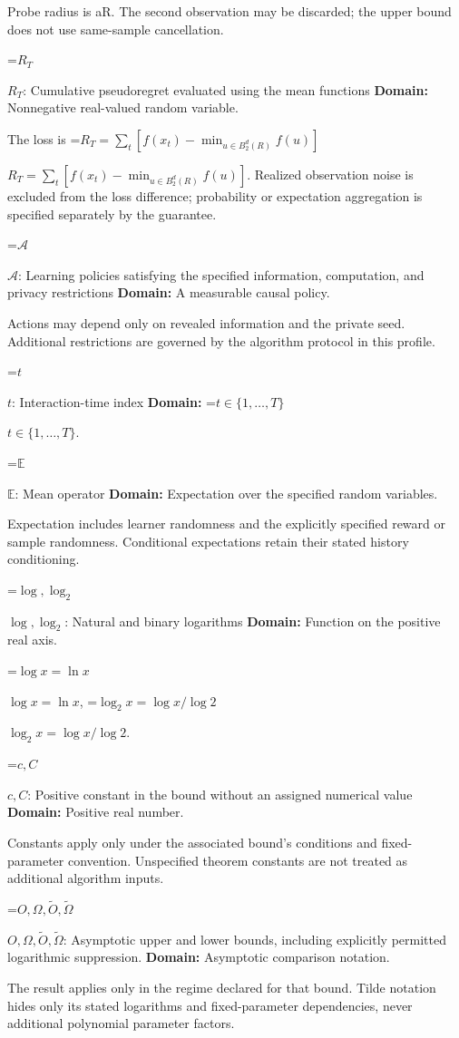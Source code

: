 \documentclass[10pt,a4paper]{article}
\newcommand{\AtlasMath}[1]{\par\begingroup\centering\setbox0=\hbox{$\displaystyle #1$}\ifdim\wd0>1.4\linewidth\typeout{ATLAS WIDE FORMULA: \the\wd0}\fi\ifdim\wd0>\linewidth\resizebox{\linewidth}{!}{\box0}\else\box0\fi\par\endgroup}
\newcommand{\AtlasInlineMath}[1]{\begingroup\setbox0=\hbox{$#1$}\ifdim\wd0>.4\linewidth\endgroup\AtlasMath{#1}\else\endgroup$#1$\fi}
\begin{document}
Probe radius is aR. The second observation may be discarded; the upper bound does not use same-sample cancellation.

\AtlasInlineMath{R_T}: Cumulative pseudoregret evaluated using the mean functions \textbf{Domain:} Nonnegative real-valued random variable.

The loss is \AtlasInlineMath{R_T=\sum_t[f(x_t)-\min_{u\in B_2^d(R)}f(u)]}. Realized observation noise is excluded from the loss difference; probability or expectation aggregation is specified separately by the guarantee.

\AtlasInlineMath{\mathcal A}: Learning policies satisfying the specified information, computation, and privacy restrictions \textbf{Domain:} A measurable causal policy.

Actions may depend only on revealed information and the private seed. Additional restrictions are governed by the algorithm protocol in this profile.

\AtlasInlineMath{t}: Interaction-time index \textbf{Domain:} \AtlasInlineMath{t\in\{1,\ldots,T\}}.

\AtlasInlineMath{\mathbb E}: Mean operator \textbf{Domain:} Expectation over the specified random variables.

Expectation includes learner randomness and the explicitly specified reward or sample randomness. Conditional expectations retain their stated history conditioning.

\AtlasInlineMath{\log,\log_2}: Natural and binary logarithms \textbf{Domain:} Function on the positive real axis.

\AtlasInlineMath{\log x=\ln x}, \AtlasInlineMath{\log_2x=\log x/\log2}.

\AtlasInlineMath{c,C}: Positive constant in the bound without an assigned numerical value \textbf{Domain:} Positive real number.

Constants apply only under the associated bound’s conditions and fixed-parameter convention. Unspecified theorem constants are not treated as additional algorithm inputs.

\AtlasInlineMath{O,\Omega,\widetilde O,\widetilde\Omega}: Asymptotic upper and lower bounds, including explicitly permitted logarithmic suppression. \textbf{Domain:} Asymptotic comparison notation.

The result applies only in the regime declared for that bound. Tilde notation hides only its stated logarithms and fixed-parameter dependencies, never additional polynomial parameter factors.
\end{document}
